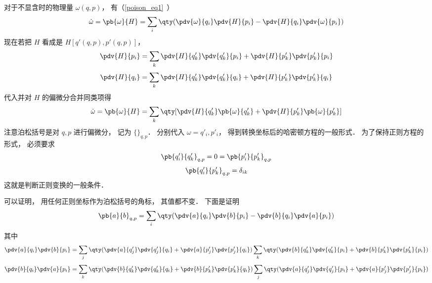 对于不显含时的物理量 $\omega(q, p)$， 有（\autoref{poison_eq1}~）
\begin{equation}
\dot \omega  = \pb{\omega}{H}  = \sum_i \qty(\pdv{\omega}{q_i}\pdv{H}{p_i} - \pdv{H}{q_i} \pdv{\omega}{p_i})
\end{equation}
现在若把 $H$ 看成是 $H[q'(q,p),p'(q,p)]$，  
\begin{equation}
\pdv{H}{p_i} = \sum_k \pdv{H}{q'_k} \pdv{q'_k}{p_i} + \pdv{H}{p'_k} \pdv{p'_k}{p_i}
\end{equation}
\begin{equation}
\pdv{H}{q_i} = \sum_k \pdv{H}{q'_k} \pdv{q'_k}{q_i} + \pdv{H}{p'_k} \pdv{p'_k}{q_i}
\end{equation}
代入并对 $H$ 的偏微分合并同类项得
\begin{equation}
\dot \omega  = \pb{\omega}{H} = \sum_k \qty[ \pdv{H}{q'_k} \pb{\omega}{q'_k} + \pdv{H}{p'_k} \pb{\omega}{p'_k}]
\end{equation}
注意泊松括号是对 $q,p$ 进行偏微分， 记为 $\{ {}\}_{q,p}$．  分别代入 $\omega  = q'_i, p'_i$，  得到转换坐标后的哈密顿方程的一般形式． 为了保持正则方程的形式， 必须要求
\begin{equation}
\pb{q'_i}{q'_k}_{q,p} = 0 = \pb{p'_i}{p'_k}_{q,p}
\end{equation}
\begin{equation}
\pb{q'_i}{p'_k}_{q,p} = \delta_{ik}
\end{equation}
这就是判断正则变换的一般条件．

可以证明， 用任何正则坐标作为泊松括号的角标， 其值都不变． 下面是证明
\begin{equation}
\pb{a}{b}_{q,p} = \sum_i \qty( \pdv{a}{q_i}\pdv{b}{p_i} - \pdv{b}{q_i}\pdv{a}{p_i} ) 
\end{equation}
其中
\begin{equation}
\pdv{a}{q_i} \pdv{b}{p_i} = \sum_j \qty( \pdv{a}{q'_j} \pdv{q'_j}{q_i} + \pdv{a}{p'_j}\pdv{p'_j}{q_i} ) \sum_k \qty(\pdv{b}{q'_k}\pdv{q'_k}{p_i} + \pdv{b}{p'_k}\pdv{p'_k}{p_i}) 
\end{equation}
\begin{equation}
\pdv{b}{q_i} \pdv{a}{p_i} = \sum_k \qty( \pdv{b}{q'_k}\pdv{q'_k}{q_i} + \pdv{b}{p'_k}\pdv{p'_k}{q_i} ) \sum_j \qty(\pdv{a}{q'_j}\pdv{q'_j}{p_i} + \pdv{a}{p'_j}\pdv{p'_j}{p_i})
\end{equation}
 
